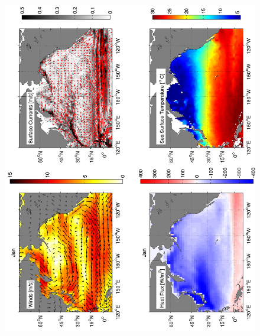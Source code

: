 \begin{figure}[hbt]
  \begin{center}
  \includegraphics[angle=270]{figs/WindOverview/SurfaceCurrents01}
    \caption{}
    \label{fig:}  
  \end{center}
\end{figure}

